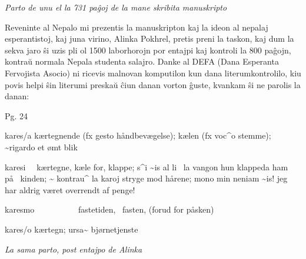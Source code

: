 {\centering{}\itshape
Parto de unu el la 731 pa\^goj de la mane skribita manuskripto
\par}

{
Reveninte al Nepalo mi prezentis la manuskripton kaj la ideon al nepalaj
esperantistoj, kaj juna virino, Alinka Pokhrel, pretis preni la taskon,
kaj dum la sekva jaro \^si uzis pli ol 1500 laborhorojn por entajpi kaj
kontroli la 800 pa\^gojn, kontra\u{u} normala Nepala studenta salajro.
Danke al DEFA (Dana Esperanta Fervojista Asocio) ni ricevis malnovan
komputilon kun dana literumkontrolilo, kiu povis helpi \^sin literumi
preska\u{u} \^ciun danan vorton \^guste, kvankam \^si ne parolis la
danan: }

{\centering{}
\begin{minipage}{7.361cm}
{
Pg. \foreignlanguage{danish}{24} }

{
\foreignlanguage{danish}{kares/a k{\ae}rtegnende (fx
}\foreignlanguage{danish}{gesto}\foreignlanguage{danish}{
h{\aa}ndbev{\ae}gelse); k{\ae}len (fx
}\foreignlanguage{danish}{voc\^{}o}\foreignlanguage{danish}{ stemme);
}\foreignlanguage{danish}{\~{}rigardo}\foreignlanguage{danish}{ et
{\o}mt blik} }


\bigskip

{
\foreignlanguage{danish}{karesi~~ k{\ae}rtegne, k{\ae}le for, klappe;
}\foreignlanguage{danish}{s\^{}i \~{}is al li~ la
vangon}\foreignlanguage{danish}{ hun klappeda ham p{\aa}~ kinden;
}\foreignlanguage{danish}{\~{} kontrau\^{} la
karoj}\foreignlanguage{danish}{ stryge mod h{\aa}rene;
}\foreignlanguage{danish}{mono min neniam
\~{}is!}\foreignlanguage{danish}{ jeg har aldrig v{\ae}ret overrendt af
penge!} }


\bigskip

{
\foreignlanguage{danish}{karesmo~~~~~~~~~~ fastetiden,~ fasten, (forud
for p{\aa}sken)} }


\bigskip

{
\foreignlanguage{danish}{kares/o k{\ae}rtegn;
}\foreignlanguage{danish}{ursa\~{}}\foreignlanguage{danish}{
bj{\o}rnetjenste} }

\end{minipage} 
\par}

{\centering{}\itshape
La sama parto, post entajpo de Alinka
\par}

